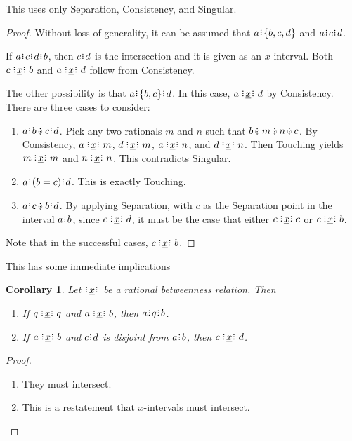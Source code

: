 \documentclass[12pt]{article}
\newtheorem{corollary}{Corollary}[section]
\begin{document}
This uses only Separation, Consistency, and Singular. 

\begin{proof}
    Without loss of generality, it can be assumed that $a \rint \{b, c, d\}$ and $a \rint c \rint d$. 

    If $a \rint c \rint d \rint b$, then $c\rint d$ is the intersection and it is given as an $x$-interval. Both $c \xrel b$ and $a \xrel d$ follow from Consistency.

    The other possibility is that $a \rint \{b, c\} \rint d$. In this case, $a \xrel d$ by Consistency. There are three cases to consider:

    \begin{enumerate}
        \item $a \rint b \betneq c\rint d$. Pick any two rationals $m$ and $n$ such that $b \betneq m \betneq n \betneq c$.  By Consistency, $a \xrel m$, $d \xrel m$, $a \xrel n$, and $d \xrel n$. Then Touching yields $m \xrel m$ and $n \xrel n$. This contradicts Singular. 
        \item $a\rint (b=c)\rint d$. This is exactly Touching. 
        \item $a\rint c\betneq b\rint d$. By applying Separation, with $c$ as the Separation point in the interval $a \rint b$, since $c \xrel d$, it must be the case that either $c \xrel c$ or $c \xrel b$.
    \end{enumerate}
    Note that in the successful cases, $c \xrel b$. 
\end{proof}

This has some immediate implications

\begin{corollary}\label{lem:inter}
    Let $\xrel$ be a rational betweenness relation. Then
    \begin{enumerate}[label=\alph*., ref=\thelemma(\alph*) ]
        \item\label{br--cor--rooted} If $q \xrel q$ and $a \xrel b$, then $a \rint q \rint b$.
        \item\label{br--cor-disj} If $a \xrel b$ and $c \rint d$ is disjoint from $a \rint b$, then \sout{$c \xrel d$}. 
    \end{enumerate}
\end{corollary}

\begin{proof}
    \begin{enumerate}[label=\alph*.]
        \item They must intersect.
        \item This is a restatement that $x$-intervals must intersect.
    \end{enumerate}
\end{proof}
\end{document}
